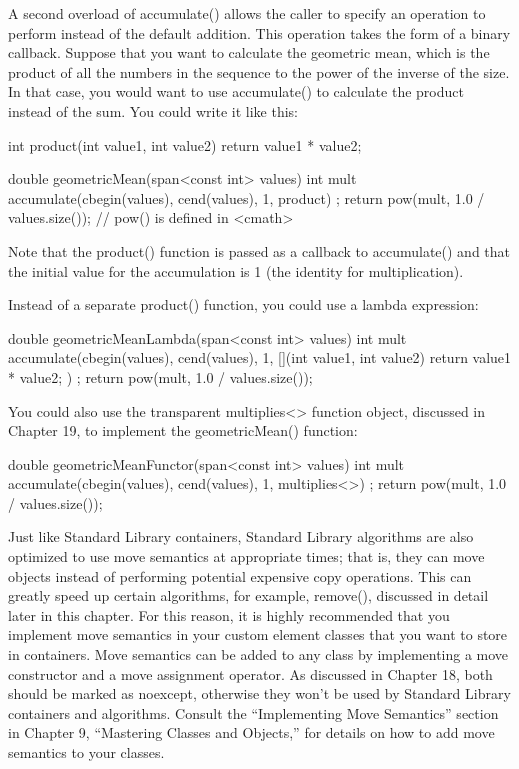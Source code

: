 A second overload of accumulate() allows the caller to specify an operation to perform instead of the default addition. This operation takes the form of a binary callback. Suppose that you want to calculate the geometric mean, which is the product of all the numbers in the sequence to the power of the inverse of the size. In that case, you would want to use accumulate() to calculate the product instead of the sum. You could write it like this:

\begin{cpp}
int product(int value1, int value2) { return value1 * value2; }

double geometricMean(span<const int> values)
{
    int mult { accumulate(cbegin(values), cend(values), 1, product) };
    return pow(mult, 1.0 / values.size()); // pow() is defined in <cmath>
}
\end{cpp}

Note that the product() function is passed as a callback to accumulate() and that the initial value for the accumulation is 1 (the identity for multiplication).

Instead of a separate product() function, you could use a lambda expression:

\begin{cpp}
double geometricMeanLambda(span<const int> values)
{
    int mult { accumulate(cbegin(values), cend(values), 1,
        [](int value1, int value2) { return value1 * value2; }) };
    return pow(mult, 1.0 / values.size());
}
\end{cpp}

You could also use the transparent multiplies<> function object, discussed in Chapter 19, to implement the geometricMean() function:

\begin{cpp}
double geometricMeanFunctor(span<const int> values)
{
    int mult { accumulate(cbegin(values), cend(values), 1, multiplies<>{}) };
    return pow(mult, 1.0 / values.size());
}
\end{cpp}


Just like Standard Library containers, Standard Library algorithms are also optimized to use move semantics at appropriate times; that is, they can move objects instead of performing potential expensive copy operations. This can greatly speed up certain algorithms, for example, remove(), discussed in detail later in this chapter. For this reason, it is highly recommended that you implement move semantics in your custom element classes that you want to store in containers. Move semantics can be added to any class by implementing a move constructor and a move assignment operator. As discussed in Chapter 18, both should be marked as noexcept, otherwise they won’t be used by Standard Library containers and algorithms. Consult the “Implementing Move Semantics” section in Chapter 9, “Mastering Classes and Objects,” for details on how to add move semantics to your classes.

